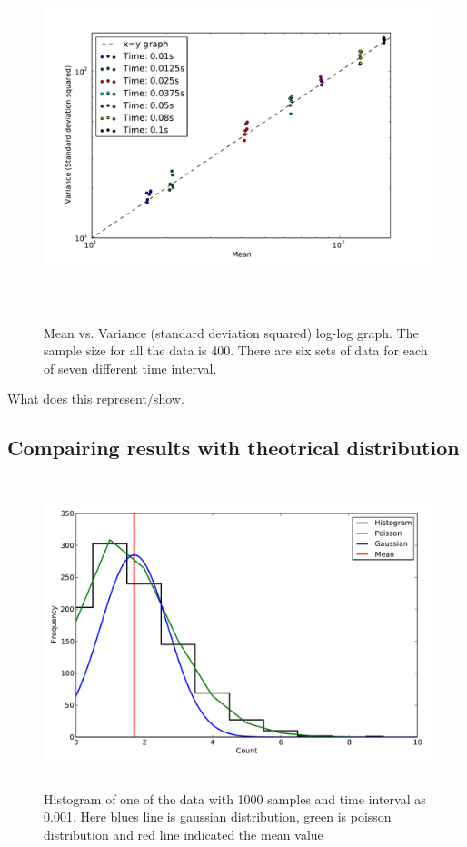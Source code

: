 \documentclass[a4paper,12pt]{article}
\begin{document}
\begin{figure}[H]
\centering
\centering
\includegraphics[angle=0,height=10cm,width=15.5cm]{graphs/Task7_log-log.pdf}
\label{fig:task7_log}
\caption{Mean vs. Variance (standard deviation squared) log-log graph. The sample size for all the data is 400. There are six sets of data for each of seven different time interval.}
\end{figure}
What does this represent/show.

\subsection{Compairing results with theotrical distribution}
\label{sec:theoritical}

\begin{figure}[H]
\centering
\includegraphics[angle=0,height=9cm,width=15.5cm]{graphs/Hist_distribution_small.pdf}
\caption{Histogram of one of the data with 1000 samples and time interval as 0.001. Here blues line is gaussian distribution, green is poisson distribution and red line indicated the mean value}
\label{fig:dark_plot}
\end{figure}
\end{document}
